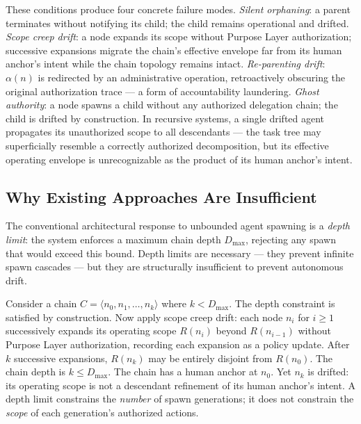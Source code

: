 These conditions produce four concrete failure modes. \emph{Silent orphaning}: a parent terminates without notifying its child; the child remains operational and drifted. \emph{Scope creep drift}: a node expands its scope without Purpose Layer authorization; successive expansions migrate the chain's effective envelope far from its human anchor's intent while the chain topology remains intact. \emph{Re-parenting drift}: $\alpha(n)$ is redirected by an administrative operation, retroactively obscuring the original authorization trace — a form of accountability laundering. \emph{Ghost authority}: a node spawns a child without any authorized delegation chain; the child is drifted by construction. In recursive systems, a single drifted agent propagates its unauthorized scope to all descendants — the task tree may superficially resemble a correctly authorized decomposition, but its effective operating envelope is unrecognizable as the product of its human anchor's intent.

\subsection{Why Existing Approaches Are Insufficient}

The conventional architectural response to unbounded agent spawning is a \emph{depth limit}: the system enforces a maximum chain depth $D_{\max}$, rejecting any spawn that would exceed this bound. Depth limits are necessary — they prevent infinite spawn cascades — but they are structurally insufficient to prevent autonomous drift.

Consider a chain $C = \langle n_0, n_1, \ldots, n_k \rangle$ where $k < D_{\max}$. The depth constraint is satisfied by construction. Now apply scope creep drift: each node $n_i$ for $i \geq 1$ successively expands its operating scope $R(n_i)$ beyond $R(n_{i-1})$ without Purpose Layer authorization, recording each expansion as a policy update. After $k$ successive expansions, $R(n_k)$ may be entirely disjoint from $R(n_0)$. The chain depth is $k \leq D_{\max}$. The chain has a human anchor at $n_0$. Yet $n_k$ is drifted: its operating scope is not a descendant refinement of its human anchor's intent. A depth limit constrains the \emph{number} of spawn generations; it does not constrain the \emph{scope} of each generation's authorized actions.

